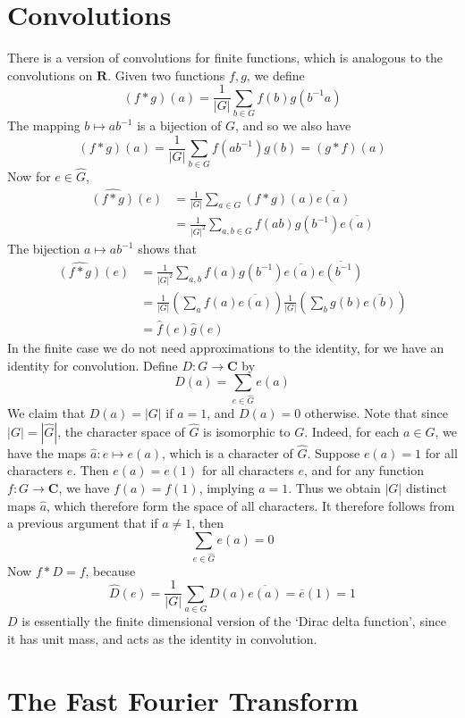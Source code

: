 \section{Convolutions}

There is a version of convolutions for finite functions, which is analogous to the convolutions on $\mathbf{R}$. Given two functions $f,g$, we define
%
\[ (f * g)(a) = \frac{1}{|G|} \sum_{b \in G} f(b) g(b^{-1} a) \]
%
The mapping $b \mapsto ab^{-1}$ is a bijection of $G$, and so we also have
%
\[ (f * g)(a) = \frac{1}{|G|} \sum_{b \in G} f(ab^{-1}) g(b) = (g * f)(a) \]
%
Now for $e \in \hat{G}$,
%
\begin{align*}
    \widehat{(f * g)}(e) &= \frac{1}{|G|} \sum_{a \in G} (f*g)(a) \overline{e(a)}\\
    &= \frac{1}{|G|^2} \sum_{a,b \in G} f(ab) g(b^{-1}) \overline{e(a)}
\end{align*}
%
The bijection $a \mapsto ab^{-1}$ shows that
%
\begin{align*}
    \widehat{(f*g)}(e) &= \frac{1}{|G|^2} \sum_{a,b} f(a) g(b^{-1}) \overline{e(a)} \overline{e(b^{-1})}\\
    &= \frac{1}{|G|} \left( \sum_a f(a) \overline{e(a)} \right) \frac{1}{|G|} \left( \sum_b g(b) \overline{e(b)} \right)\\
    &= \hat{f}(e) \hat{g}(e)
\end{align*}
%
In the finite case we do not need approximations to the identity, for we have an identity for convolution. Define $D: G \to \mathbf{C}$ by
%
\[ D(a) = \sum_{e \in \hat{G}} e(a) \]
%
We claim that $D(a) = |G|$ if $a = 1$, and $D(a) = 0$ otherwise. Note that since $|G| = |\hat{G}|$, the character space of $\hat{G}$ is isomorphic to $G$. Indeed, for each $a \in G$, we have the maps $\hat{a}: e \mapsto e(a)$, which is a character of $\hat{G}$. Suppose $e(a) = 1$ for all characters $e$. Then $e(a) = e(1)$ for all characters $e$, and for any function $f: G \to \mathbf{C}$, we have $f(a) = f(1)$, implying $a = 1$. Thus we obtain $|G|$ distinct maps $\hat{a}$, which therefore form the space of all characters. It therefore follows from a previous argument that if $a \neq 1$, then
%
\[ \sum_{e \in \hat{G}} e(a) = 0 \]
%
Now $f * D = f$, because
%
\[ \widehat{D}(e) = \frac{1}{|G|} \sum_{a \in G} D(a) \overline{e(a)} = \overline{e}(1) = 1 \]
%
$D$ is essentially the finite dimensional version of the `Dirac delta function', since it has unit mass, and acts as the identity in convolution.

\section{The Fast Fourier Transform}

